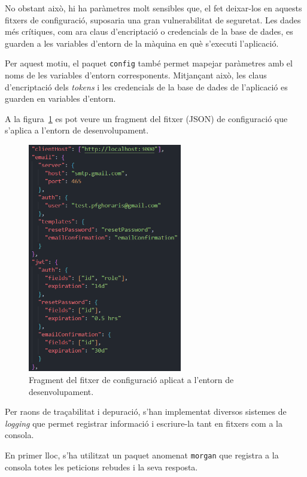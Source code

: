 \documentclass[a4paper,12pt]{ThesisStyle}
\begin{document}
No obstant això, hi ha paràmetres molt sensibles que, el fet deixar-los en aquests fitxers de configuració, suposaria una gran vulnerabilitat de seguretat. Les dades més crítiques, com ara claus d'encriptació o credencials de la base de dades, es guarden a les variables d'entorn de la màquina en què s'executi l'aplicació.

Per aquest motiu, el paquet \texttt{config} també permet mapejar paràmetres amb el noms de les variables d'entorn corresponents. Mitjançant això, les claus d'encriptació dels \textit{tokens} i les credencials de la base de dades de l'aplicació es guarden en variables d'entorn.

A la figura~\ref{img:devConfig} es pot veure un fragment del fitxer (JSON) de configuració que s'aplica a l'entorn de desenvolupament.

\begin{figure}[H]
  \centering
  \includegraphics[width=0.6\textwidth]{assets/code/config/devConfig.png}
  \caption{\label{img:devConfig}Fragment del fitxer de configuració aplicat a l'entorn de desenvolupament.}
\end{figure}

Per raons de traçabilitat i depuració, s'han implementat diversos sistemes de \textit{logging} que permet registrar informació i escriure-la tant en fitxers com a la consola.

En primer lloc, s'ha utilitzat un paquet anomenat \texttt{morgan} que registra a la consola totes les peticions rebudes i la seva resposta.
\end{document}
